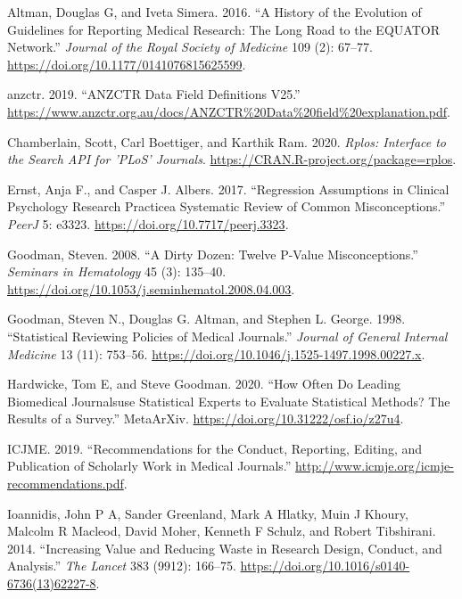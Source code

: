 \documentclass[
]{article}
\begin{document}
\leavevmode\hypertarget{ref-Altman2016}{}%
Altman, Douglas G, and Iveta Simera. 2016. ``A History of the Evolution
of Guidelines for Reporting Medical Research: The Long Road to the
EQUATOR Network.'' \emph{Journal of the Royal Society of Medicine} 109
(2): 67--77. \url{https://doi.org/10.1177/0141076815625599}.

\leavevmode\hypertarget{ref-ANZCTR}{}%
anzctr. 2019. ``ANZCTR Data Field Definitions V25.''
\url{https://www.anzctr.org.au/docs/ANZCTR\%20Data\%20field\%20explanation.pdf}.

\leavevmode\hypertarget{ref-rplos}{}%
Chamberlain, Scott, Carl Boettiger, and Karthik Ram. 2020. \emph{Rplos:
Interface to the Search API for 'PLoS' Journals}.
\url{https://CRAN.R-project.org/package=rplos}.

\leavevmode\hypertarget{ref-Ernst2017}{}%
Ernst, Anja F., and Casper J. Albers. 2017. ``Regression Assumptions in
Clinical Psychology Research Practicea Systematic Review of Common
Misconceptions.'' \emph{PeerJ} 5: e3323.
\url{https://doi.org/10.7717/peerj.3323}.

\leavevmode\hypertarget{ref-Goodman2008}{}%
Goodman, Steven. 2008. ``A Dirty Dozen: Twelve P-Value Misconceptions.''
\emph{Seminars in Hematology} 45 (3): 135--40.
\url{https://doi.org/10.1053/j.seminhematol.2008.04.003}.

\leavevmode\hypertarget{ref-Goodman1998}{}%
Goodman, Steven N., Douglas G. Altman, and Stephen L. George. 1998.
``Statistical Reviewing Policies of Medical Journals.'' \emph{Journal of
General Internal Medicine} 13 (11): 753--56.
\url{https://doi.org/10.1046/j.1525-1497.1998.00227.x}.

\leavevmode\hypertarget{ref-Hardwicke2020}{}%
Hardwicke, Tom E, and Steve Goodman. 2020. ``How Often Do Leading
Biomedical Journalsuse Statistical Experts to Evaluate Statistical
Methods? The Results of a Survey.'' MetaArXiv.
\url{https://doi.org/10.31222/osf.io/z27u4}.

\leavevmode\hypertarget{ref-ICMJE2019}{}%
ICJME. 2019. ``Recommendations for the Conduct, Reporting, Editing, and
Publication of Scholarly Work in Medical Journals.''
\url{http://www.icmje.org/icmje-recommendations.pdf}.

\leavevmode\hypertarget{ref-Ioannidis2014}{}%
Ioannidis, John P A, Sander Greenland, Mark A Hlatky, Muin J Khoury,
Malcolm R Macleod, David Moher, Kenneth F Schulz, and Robert Tibshirani.
2014. ``Increasing Value and Reducing Waste in Research Design, Conduct,
and Analysis.'' \emph{The Lancet} 383 (9912): 166--75.
\url{https://doi.org/10.1016/s0140-6736(13)62227-8}.
\end{document}
